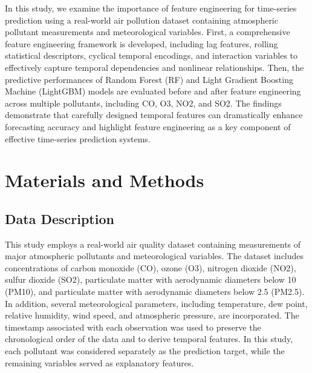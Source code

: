 \documentclass[twoside]{article}
\begin{document}
In this study, we examine the importance of feature engineering for time-series prediction using a real-world air pollution dataset containing atmospheric pollutant measurements and meteorological variables. First, a comprehensive feature engineering framework is developed, including lag features, rolling statistical descriptors, cyclical temporal encodings, and interaction variables to effectively capture temporal dependencies and nonlinear relationships. Then, the predictive performances of Random Forest (RF) and Light Gradient Boosting Machine (LightGBM) models are evaluated before and after feature engineering across multiple pollutants, including CO, O3, NO2, and SO2. The findings demonstrate that carefully designed temporal features can dramatically enhance forecasting accuracy and highlight feature engineering as a key component of effective time-series prediction systems.



\section{Materials and Methods}
\subsection{Data Description}

This study employs a real-world air quality dataset containing measurements of major atmospheric pollutants and meteorological variables. The dataset includes concentrations of carbon monoxide (CO), ozone (O3), nitrogen dioxide (NO2), sulfur dioxide (SO2), particulate matter with aerodynamic diameters below 10 (PM10), and particulate matter with aerodynamic diameters below 2.5 (PM2.5). In addition, several meteorological parameters, including temperature, dew point, relative humidity, wind speed, and atmospheric pressure, are incorporated. The timestamp associated with each observation was used to preserve the chronological order of the data and to derive temporal features. In this study, each pollutant was considered separately as the prediction target, while the remaining variables served as explanatory features.
\end{document}
